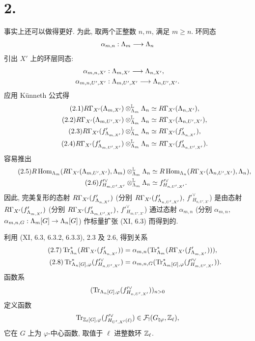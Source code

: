 \section*{2.}
事实上还可以做得更好. 为此, 取两个正整数 $n,m$, 满足 $m\ge n$. 环同态
\[
\alpha_{m,n}:\Lambda_m\longrightarrow \Lambda_n
\]
引出 $X'$ 上的环层同态:
\begin{align*}
\alpha_{m,n,X'}&:\Lambda_{m,X'}\longrightarrow \Lambda_{n,X'},\\
\alpha_{m,n,U',X'}&:\Lambda_{m,U',X'}\longrightarrow \Lambda_{n,U',X'} .
\end{align*}
应用 Künneth 公式得
\begin{align}
\tag{2.1}R\Gamma_{X'}(\Lambda_{m,X'})\otimes_{\Lambda_m}^{\mathbb L}\Lambda_n&\simeq R\Gamma_{X'}(\Lambda_{n,X'}),\\
\tag{2.2}R\Gamma_{X'}(\Lambda_{m,U',X'})\otimes_{\Lambda_m}^{\mathbb L}\Lambda_n&\simeq R\Gamma_{X'}(\Lambda_{n,U',X'}),\\
\tag{2.3}R\Gamma_{X'}(f'_{\Lambda_{m,X'}})\otimes_{\Lambda_m}^{\mathbb L}\Lambda_n&\simeq R\Gamma_{X'}(f'_{\Lambda_{n,X'}}),\\
\tag{2.4}R\Gamma_{X'}(f'_{\Lambda_{m,U',X'}})\otimes_{\Lambda_m}^{\mathbb L}\Lambda_n&\simeq R\Gamma_{X'}(f'_{\Lambda_{n,U',X'}}).
\end{align}
容易推出
\begin{align}
\tag{2.5}R\operatorname{Hom}_{\Lambda_m}(R\Gamma_{X'}(\Lambda_{m,U',X'}),\Lambda_m)\otimes_{\Lambda_m}^{\mathbb L}\Lambda_n&\simeq R\operatorname{Hom}_{\Lambda_n}(R\Gamma_{X'}(\Lambda_{n,U',X'}),\Lambda_n),\\
\tag{2.6}f'^\vee_{H_{m,U',X'}}\otimes_{\Lambda_m}^{\mathbb L}\Lambda_n&\simeq f'^\vee_{H_{n,U',X'}}.
\end{align}
因此, 完美复形的态射 $R\Gamma_{X'}(f'_{\Lambda_{n,X'}})$ (分别 $R\Gamma_{X'}(f'_{\Lambda_{n,U',X'}})$, $f'^\vee_{H_{n,U',X'}}$) 是由态射 $R\Gamma_{X'}(f'_{\Lambda_{m,X'}})$ (分别 $R\Gamma_{X'}(f'_{\Lambda_{m,U',X'}})$, $f'^\vee_{H_{m,U',X'}}$) 通过态射 $\alpha_{m,n}$ (分别 $\alpha_{m,n}$, $\alpha_{m,n,G}:\Lambda_m[G]\to\Lambda_n[G]$) 作标量扩张 (XI, 6.3) 而得到的.

利用 (XI, 6.3, 6.3.2, 6.3.3), 2.3 及 2.6, 得到关系
\begin{align}
\tag{2.7}\operatorname{Tr}^*_{\Lambda_n}(R\Gamma_{X'}(f'_{\Lambda_{n,X'}}))&=\alpha_{m,n}(\operatorname{Tr}^*_{\Lambda_m}(R\Gamma_{X'}(f'_{\Lambda_{m,X'}}))),\\
\tag{2.8}\operatorname{Tr}^*_{\Lambda_n[G],\varphi}(f'^\vee_{H_{n,U',X'}})&=\alpha_{m,n,G}(\operatorname{Tr}^*_{\Lambda_m[G],\varphi}(f'^\vee_{H_{m,U',X'}})).
\end{align}
函数系
\[
(\operatorname{Tr}_{\Lambda_n[G],\varphi}(f'^\vee_{H_{n,U',X'}}))_{n>0}
\]
定义函数
\[
\operatorname{Tr}_{\mathbb Z_\ell[G],\varphi}(f'^\vee_{H_{U',X'}(\ell)})
\in \mathcal F_!(G_{\natural\varphi},\mathbb Z_\ell),
\]
它在 $G$ 上为 $\varphi$-中心函数, 取值于 $\ell$ 进整数环 $\mathbb Z_\ell$.

